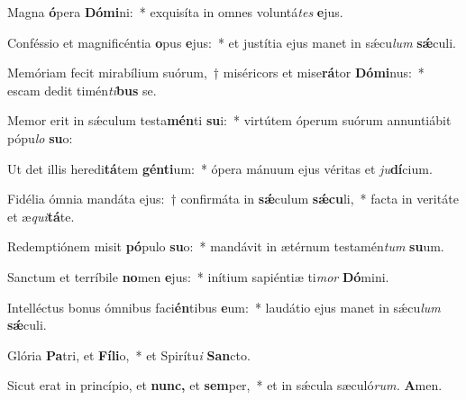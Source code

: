 \item Magna \textbf{ó}pera \textbf{Dó}\textbf{mi}ni:~* exquisíta in omnes voluntá\hspace{0.03em}\textit{tes} \textbf{e}jus.
\item Conféssio et magnificéntia \textbf{o}pus \textbf{e}jus:~* et justítia ejus manet in sǽcu\hspace{0.03em}\textit{lum} \textbf{sǽ}culi.
\item Memóriam fecit mirabílium suórum,~† miséricors et mise\textbf{rá}tor \textbf{Dó}\textbf{mi}nus:~* escam dedit timén\hspace{0.03em}\textit{ti}\textbf{bus} se.
\item Memor erit in sǽculum testa\textbf{mén}ti \textbf{su}i:~* virtútem óperum suórum annuntiábit pópu\hspace{0.03em}\textit{lo} \textbf{su}o:
\item Ut det illis heredi\textbf{tá}tem \textbf{gén}\textbf{ti}um:~* ópera mánuum ejus véritas et \textit{ju}\textbf{dí}cium.
\item Fidélia ómnia mandáta ejus:~† confirmáta in \textbf{sǽ}culum \textbf{sǽ}\textbf{cu}li,~* facta in veritáte et æ\hspace{0.03em}\textit{qui}\textbf{tá}te.
\item Redemptiónem misit \textbf{pó}pulo \textbf{su}o:~* mandávit in ætérnum testamén\hspace{0.03em}\textit{tum} \textbf{su}um.
\item Sanctum et terríbile \textbf{no}men \textbf{e}jus:~* inítium sapiéntiæ ti\hspace{0.03em}\textit{mor} \textbf{Dó}mini.
\item Intelléctus bonus ómnibus faci\textbf{én}tibus \textbf{e}um:~* laudátio ejus manet in sǽcu\hspace{0.03em}\textit{lum} \textbf{sǽ}culi.
\item Glória \textbf{Pa}tri, et \textbf{Fí}\textbf{li}o,~* et Spirítu\hspace{0.03em}\textit{i} \textbf{San}cto.
\item Sicut erat in princípio, et \textbf{nunc,} et \textbf{sem}per,~* et in sǽcula sæculó\textit{rum.} \textbf{A}men.
